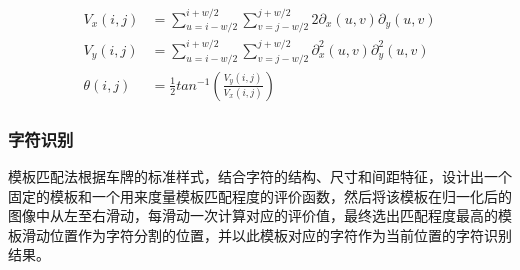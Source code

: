 \begin{equation}\label{eq:HyperLPR}
	\begin{split}
		V_x(i,j)&=\sum_{u=i-w/2}^{i+w/2}\sum_{v=j-w/2}^{j+w/2}2\partial_x(u,v)\partial_y(u,v)\\
		V_y(i,j)&=\sum_{u=i-w/2}^{i+w/2}\sum_{v=j-w/2}^{j+w/2}\partial^2_x(u,v)\partial^2_y(u,v)\\
		\theta(i,j)&=\frac{1}{2}tan^{-1}(\frac{V_y(i,j)}{V_x(i,j)})
	\end{split}
\end{equation}

\subsubsection{字符识别}
模板匹配法根据车牌的标准样式，结合字符的结构、尺寸和间距特征，设计出一个固定的模板和一个用来度量模板匹配程度的评价函数，然后将该模板在归一化后的图像中从左至右滑动，每滑动一次计算对应的评价值，最终选出匹配程度最高的模板滑动位置作为字符分割的位置，并以此模板对应的字符作为当前位置的字符识别结果。
